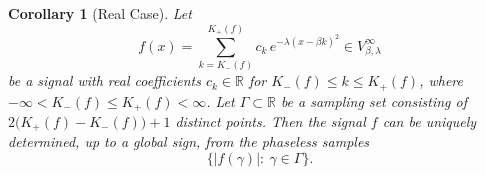 \documentclass[11pt,oneside,reqno]{amsart}
\newtheorem{corollary}[thm]{Corollary}
\numberwithin{equation}{section}
\def\R{ {\mathbb R} }
\begin{document}
\begin{corollary}[Real Case]\label{cor:real-coef-pr}
Let
\[
f(x)=\sum_{k=K_-(f)}^{K_+(f)} c_k\, e^{-\lambda(x-\beta k)^2}
\in V^\infty_{\beta,\lambda}
\]
be a signal with real coefficients $c_k\in\R$ for $K_-(f)\le k\le K_+(f)$, where
$-\infty< K_-(f)\le K_+(f)<\infty$. 
Let $\Gamma\subset\mathbb R$ be a sampling set consisting of
$2\bigl(K_+(f)-K_-(f)\bigr)+1$ distinct points. 
Then the signal $f$ can be uniquely determined, up to a global sign, from the phaseless samples
\[
\bigl\{|f(\gamma)|:\ \gamma\in\Gamma\bigr\}.
\]
\end{corollary}

\end{document}
